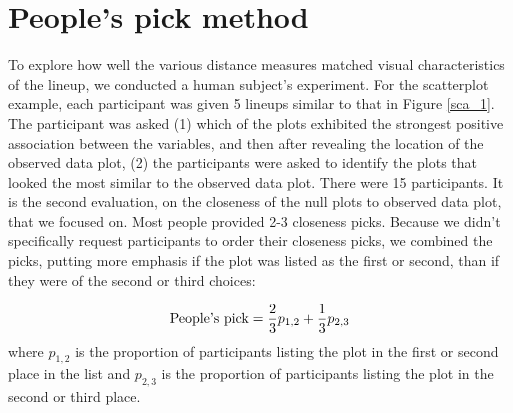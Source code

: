 \documentclass[12]{report}
\begin{document}
\section{People's pick method}\label{user.distance}

To explore how well the various distance measures matched visual characteristics of the lineup,  we conducted a human subject's experiment. For the scatterplot example, each participant was given 5 lineups similar to that in Figure \ref{sca_1}. The participant was asked (1) which of the plots exhibited the strongest positive association between the variables, and then after revealing the location of the observed data plot,  (2) the participants were asked to identify the plots that looked the most similar to the observed data plot. There were 15 participants.  It is the second evaluation, on the closeness of the null plots to observed data plot, that we focused on. Most people provided 2-3 closeness picks.  Because we didn't specifically request participants to order their closeness picks, we combined the picks, putting more emphasis if the plot was listed as the first or second, than if they were of the second or third choices:





\[
\hbox{People's pick} = \frac{2}{3} p_{1,2} + \frac{1}{3} p_{2,3}
\]
where $p_{1,2}$ is the proportion of participants listing the plot  in the first or second place in the list and $p_{2,3}$ is the proportion of participants listing the plot in the second or third place.
\end{document}
